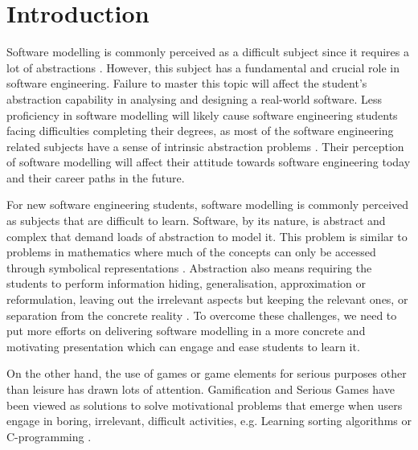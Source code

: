 \documentclass[runningheads,a4paper]{llncs}
\begin{document}
\section{Introduction}
Software modelling is commonly perceived as a difficult subject since it requires a lot of abstractions \cite{Borstler2012}. However, this subject has a fundamental and crucial role in software engineering. Failure to master this topic will affect the student’s abstraction capability in analysing and designing a real-world software. Less proficiency in software modelling will likely cause software engineering students facing difficulties completing their degrees, as most of the software engineering related subjects have a sense of intrinsic abstraction problems \cite{Kramer2007}. Their perception of software modelling will affect their attitude towards software engineering today and their career paths in the future.

For new software engineering students, software modelling is commonly perceived as subjects that are difficult to learn. Software, by its nature, is abstract and complex that demand loads of abstraction to model it. This problem is similar to problems in mathematics where much of the concepts can only be accessed through symbolical representations \cite{Duval2006}. Abstraction also means requiring the students to perform information hiding, generalisation, approximation or reformulation, leaving out the irrelevant aspects but keeping the relevant ones, or separation from the concrete reality \cite{Saitta2013}. To overcome these challenges, we need to put more efforts on delivering software modelling in a more concrete and motivating presentation which can engage and ease students to learn it.

On the other hand, the use of games or game elements for serious purposes other than leisure has drawn lots of attention. Gamification \cite{deterding2011game} and Serious Games \cite{Michael2005} have been viewed as solutions to solve motivational problems that emerge when users engage in boring, irrelevant, difficult activities, e.g. Learning sorting algorithms \cite{Yohannis2015} or C-programming \cite{Ibanez2014}.
\end{document}
